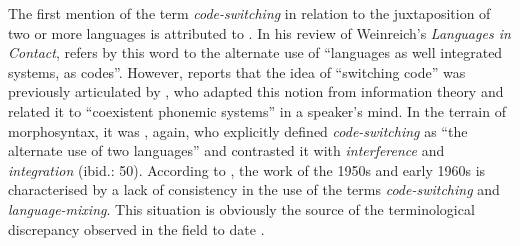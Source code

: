 The first mention of the term \textit {code-switching} in relation to the juxtaposition of two or more languages is attributed to \citet{vogt-rev-1954}. In his review of Weinreich's \textit{Languages in Contact}, \citet[][81]{vogt-rev-1954} refers by this word to the alternate use of ``languages as well integrated systems, as codes''. However, \citet{alvarez-caccamo-switching-1998} reports that the idea of  ``switching code'' was previously articulated by \citet[][11]{jakobson-preliminaries-1976}, who adapted this notion from information theory and related it to ``coexistent phonemic systems'' in a speaker's mind. In the terrain of morphosyntax, it was \citet[][40]{haugen-bilingualism-1956}, again, who explicitly defined \textit{code-switching} as ``the alternate use of two languages'' and contrasted it with \textit{interference} and \textit{integration} (ibid.: 50). According to \citet{alvarez-caccamo-switching-1998}, the work of the 1950s and early 1960s is characterised by a lack of consistency in the use of the terms \textit{code-switching} and \textit{language-mixing}. This situation is obviously the source of the terminological discrepancy observed in the field to date \citep[for overviews, see][]{ammon-code-switching-2004, ammon-code-switching-2005}.\largerpage

